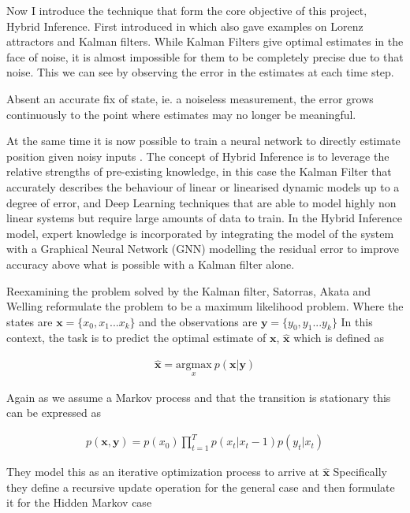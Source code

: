 \documentclass[]{../resources/final_report}
\begin{document}
Now I introduce the technique that form the core objective of this project, Hybrid Inference. First 
introduced in \cite{Satorras2019CombiningGA} which also gave examples on Lorenz attractors and 
Kalman filters. While Kalman Filters give optimal estimates in the face of noise, it is almost 
impossible for them to be completely precise due to that noise. This we can see by observing the 
error in the estimates at each time step.

Absent an accurate fix of state, ie. a noiseless measurement, the error grows 
continuously to the point where estimates may no longer be meaningful.

At the same time it is now possible to train a neural network to directly estimate position given
noisy inputs \cite{NNStateEstimation}. The concept of Hybrid Inference is to leverage the relative 
strengths of pre-existing knowledge, in this case the Kalman Filter that accurately describes the 
behaviour of linear or linearised dynamic models up to a degree of error, and Deep Learning techniques 
that are able to model highly non linear systems but require large amounts of data to train.
In the Hybrid Inference model, expert knowledge is incorporated by integrating the model of the 
system with a Graphical Neural Network (GNN) modelling the residual error to improve accuracy above what is possible with a 
Kalman filter alone.


Reexamining the problem solved by the Kalman filter, Satorras, Akata and Welling reformulate the 
problem to be a maximum likelihood problem\cite{Satorras2019CombiningGA}.
Where the states are $\mathbf{x} = \{x_0, x_1 ... x_k\}$ and the observations are $\mathbf{y} = \{y_0, y_1 ... y_k\}$
In this context, the task is to predict the optimal estimate of $\mathbf{x}$, $\mathbf{\hat{x}}$ which is defined as

\begin{align}
  \mathbf{\hat{x}} = \underset{x}{\text{argmax}}\ p(\mathbf{x}|\mathbf{y})
\end{align}

Again as we assume a Markov process and that the transition is stationary this can be expressed as 

\begin{align}
  p(\mathbf{x},\mathbf{y}) = p(x_0)\prod_{t=1}^T p(x_t|x_t-1) p(y_t|x_t)
\end{align}

They model this as an iterative optimization process to arrive at $\mathbf{\hat{x}}$
Specifically they define a recursive update operation for the general case and then formulate it 
for the Hidden Markov case
\end{document}
